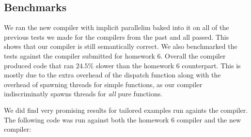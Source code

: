 \documentclass{acm_proc_article-sp}
\begin{document}
\subsection*{Benchmarks}
We ran the new compiler with implicit parallelim baked into it on all of the previous tests we made for
the compilers from the past and all passed. This shows that our compiler is still semantically correct.
We also benchmarked the tests against the compiler submitted for homework 6. Overall the compiler produced
code that ran $24.5\%$ slower than the homework 6 counterpart. This is mostly due to the extra overhead
of the dispatch function along with the overhead of spawning threads for simple functions, as our compiler
indiscriminatly spawns threads for \emph{all} pure functions.

We did find very promising results for tailored examples run againts the compiler. The following code was
run against both the homework 6 compiler and the new compiler:
\end{document}

